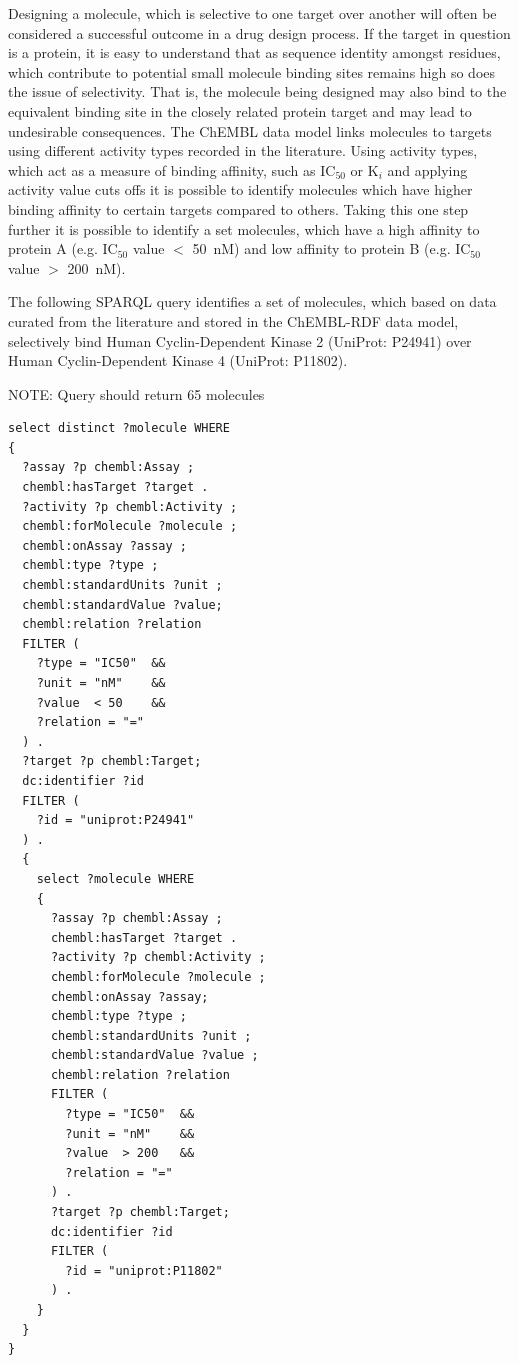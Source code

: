 \documentclass[10pt]{bmc_article}
\newenvironment{bmcformat}{\begin{raggedright}\baselineskip20pt\sloppy\setboolean{publ}{false}}{\end{raggedright}\baselineskip20pt\sloppy}
\begin{document}
\begin{bmcformat}
Designing a molecule, which is selective to one target over another will often be considered a 
successful outcome in a drug design process. If the target in question is a protein, it is easy
to understand that as sequence identity amongst residues, which contribute to potential small 
molecule binding sites remains high so does the issue of selectivity. That is, the molecule being 
designed may also bind to the equivalent binding site in the  closely related protein 
target and may lead to undesirable consequences. The ChEMBL data model links molecules to 
targets using different activity types recorded in the literature. Using activity types, 
which act as a measure of binding affinity, such as IC$_{50}$ or K$_{i}$ and applying activity value cuts
offs it is possible to identify molecules which have higher binding affinity to certain targets 
compared to others. Taking this one step further it is possible to identify a set molecules, 
which have a high affinity to protein A (e.g. IC$_{50}$ value $<$ 50~nM) and low affinity to protein 
B (e.g. IC$_{50}$ value $>$ 200~nM). 

The following SPARQL query identifies a set of molecules, which based on data curated from the 
literature and stored in the ChEMBL-RDF data model, selectively bind Human Cyclin-Dependent Kinase 2 
(UniProt: P24941) over Human Cyclin-Dependent Kinase 4 (UniProt: P11802). 

NOTE: Query should return 65 molecules

\begin{small}
\begin{verbatim}
select distinct ?molecule WHERE 
{ 
  ?assay ?p chembl:Assay ;
  chembl:hasTarget ?target .
  ?activity ?p chembl:Activity ;
  chembl:forMolecule ?molecule ;
  chembl:onAssay ?assay ;
  chembl:type ?type ;
  chembl:standardUnits ?unit ;
  chembl:standardValue ?value;
  chembl:relation ?relation
  FILTER (
    ?type = "IC50"  &&
    ?unit = "nM"    &&
    ?value  < 50    &&
    ?relation = "="
  ) .
  ?target ?p chembl:Target;
  dc:identifier ?id
  FILTER (
    ?id = "uniprot:P24941"
  ) .
  { 
    select ?molecule WHERE 
    {
      ?assay ?p chembl:Assay ;
      chembl:hasTarget ?target .
      ?activity ?p chembl:Activity ;
      chembl:forMolecule ?molecule ;
      chembl:onAssay ?assay;
      chembl:type ?type ;
      chembl:standardUnits ?unit ;
      chembl:standardValue ?value ;
      chembl:relation ?relation
      FILTER (
        ?type = "IC50"  &&
        ?unit = "nM"    &&
        ?value  > 200   &&
        ?relation = "="
      ) .
      ?target ?p chembl:Target;
      dc:identifier ?id
      FILTER (
        ?id = "uniprot:P11802"
      ) .
    }
  }
}
\end{verbatim}
\end{small}


\end{bmcformat}
\end{document}
